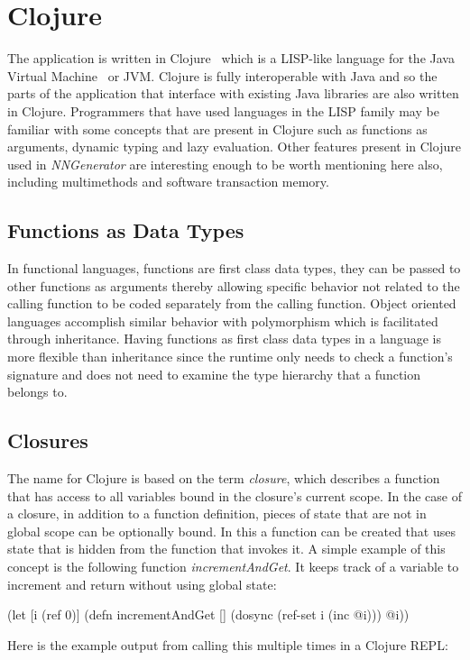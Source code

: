 \section{Clojure}
The application is written in Clojure~\cite{clj} which is a LISP-like language for the Java Virtual Machine~\cite{jvm} or JVM. 
Clojure is fully interoperable with Java and so the parts of the application that interface with existing Java libraries are also written in Clojure.
Programmers that have used languages in the LISP family may be familiar with some concepts that are present in Clojure such as
functions as arguments, dynamic typing and lazy evaluation. 
Other features present in Clojure used in {\em NNGenerator} are interesting enough to be worth mentioning here also, including multimethods and software transaction memory.

\subsection{Functions as Data Types}
In functional languages, functions are first class data types, they
can be passed to other functions as arguments thereby allowing specific behavior not related to the calling function to be coded
separately from the calling function. 
Object oriented languages accomplish similar behavior with polymorphism which is
facilitated through inheritance. 
Having functions as first class data types in a language is more
flexible than inheritance since the runtime only needs to check a
function's signature and does not need to examine the type hierarchy
that a function belongs to.   

\subsection{Closures}
The name for Clojure is based on the term {\it closure}, which
describes a function that has access to all variables bound in the
closure's current scope. 
In the case of a closure, in addition to a function definition, pieces
of state that are not in global scope can be optionally bound. 
In this a function can be created that uses state that is hidden
from the function that invokes it.
A simple example of this concept is the following function {\it incrementAndGet}.
It keeps track of a variable to increment and return without using
global state: 

(let [i (ref 0)]
  (defn incrementAndGet []
     (dosync (ref-set i (inc @i))) @i))

Here is the example output from calling this multiple times in a
Clojure REPL:

